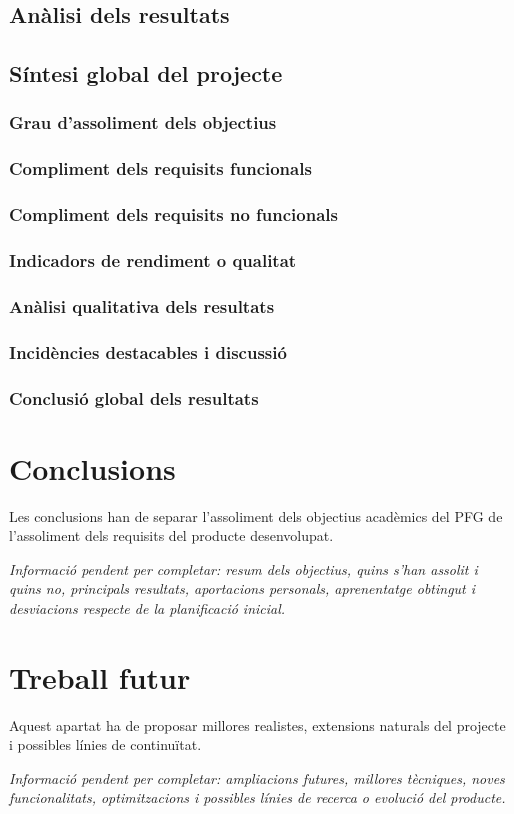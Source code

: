\documentclass[11pt,a4paper]{article}
\newcommand{\requiredinfo}[1]{%
  \vspace{0.4em}%
  {\color{placeholdergray}\textit{Informaci\'o pendent per completar: #1.}}\par
}
\newcommand{\sectionintro}[1]{%
  \vspace{0.25em}%
  #1\par
}
\begin{document}
\subsection{An\`alisi dels resultats}
\subsection{S\'intesi global del projecte}
\subsubsection{Grau d'assoliment dels objectius}
\subsubsection{Compliment dels requisits funcionals}
\subsubsection{Compliment dels requisits no funcionals}
\subsubsection{Indicadors de rendiment o qualitat}
\subsubsection{An\`alisi qualitativa dels resultats}
\subsubsection{Incid\`encies destacables i discussi\'o}
\subsubsection{Conclusi\'o global dels resultats}

\section{Conclusions}
\sectionintro{Les conclusions han de separar l'assoliment dels objectius acad\`emics del PFG de l'assoliment dels requisits del producte desenvolupat.}\requiredinfo{resum dels objectius, quins s'han assolit i quins no, principals resultats, aportacions personals, aprenentatge obtingut i desviacions respecte de la planificaci\'o inicial}

\section{Treball futur}
\sectionintro{Aquest apartat ha de proposar millores realistes, extensions naturals del projecte i possibles l\'inies de continu\"itat.}\requiredinfo{ampliacions futures, millores t\`ecniques, noves funcionalitats, optimitzacions i possibles l\'inies de recerca o evoluci\'o del producte}
\end{document}
